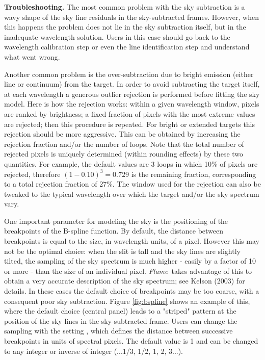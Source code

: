 \documentclass[a4paper]{article}
\newcommand{\flame}{\emph{Flame}}
\begin{document}
\begin{sloppypar}
\medskip
\noindent
\textbf{Troubleshooting.} The most common problem with the sky subtraction is a wavy shape of the sky line residuals in the sky-subtracted frames. However, when this happens the problem does not lie in the sky subtraction itself, but in the inadequate wavelength solution. Users in this case should go back to the wavelength calibration step or even the line identification step and understand what went wrong.

Another common problem is the over-subtraction due to bright emission (either line or continuum) from the target. In order to avoid subtracting the target itself, at each wavelength a generous outlier rejection is performed before fitting the sky model. Here is how the rejection works: within a given wavelength window, pixels are ranked by brightness; a fixed fraction of pixels with the most extreme values are rejected; then this procedure is repeated. For bright or extended targets this rejection should be more aggressive. This can be obtained by increasing the rejection fraction and/or the number of loops. Note that the total number of rejected pixels is uniquely determined (within rounding effects) by these two quantities. For example, the default values are 3 loops in which 10\% of pixels are rejected, therefore $(1-0.10)^3=0.729$ is the remaining fraction, corresponding to a total rejection fraction of 27\%. The window used for the rejection can also be tweaked to the typical wavelength over which the target and/or the sky spectrum vary.

One important parameter for modeling the sky is the positioning of the breakpoints of the B-spline function. By default, the distance between breakpoints is equal to the size, in wavelength units, of a pixel. However this may not be the optimal choice: when the slit is tall and the sky lines are slightly tilted, the sampling of the sky spectrum is much higher - easily by a factor of 10 or more - than the size of an individual pixel. \flame\ takes advantage of this to obtain a very accurate description of the sky spectrum; see Kelson (2003) for details. In these cases the default choice of breakpoints may be too coarse, with a consequent poor sky subtraction. Figure \ref{fig:bspline} shows an example of this, where the default choice (central panel) leads to a "striped" pattern at the position of the sky lines in the sky-subtracted frame. Users can change the sampling with the setting , which defines the distance between successive breakpoints in units of spectral pixels. The default value is 1 and can be changed to any integer or inverse of integer (...1/3, 1/2, 1, 2, 3...).



\end{sloppypar}
\end{document}
